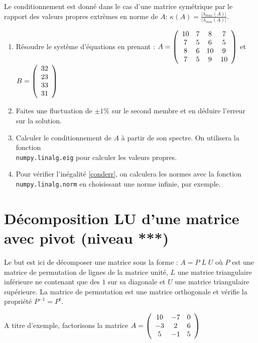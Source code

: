 \documentclass[a4paper, 10pt]{article}
\begin{document}
Le conditionnement est donné dans le cas d'une matrice symétrique
 par le rapport des valeurs propres  extrèmes en norme de $A$:
 $\kappa(A) = \frac{|\lambda_{max}(A)|}{|\lambda_{min}(A)|}$.
 
  \begin{enumerate} 
 \item Résoudre le système d'équations en prenant :
 $A=\left(
\begin{array}{c c c c}
10  & 7   &   8 & 7  \\
7  &  5   & 6 & 5   \\
8  &  6  &  10   & 9  \\
7 & 5  & 9  &  10  
\end{array}
\right)$
et $B=\left(
\begin{array}{c c c c}
32  \\
23   \\
33  \\
31 
\end{array}
\right)$ 
 \item Faites une fluctuation de $\pm 1\%$ sur le second membre et en déduire l'erreur
 sur la solution. 
 \item Calculer le conditionnement de $A$ à partir de son spectre. On utilisera la
 fonction \\ {\tt numpy.linalg.eig} pour calculer les valeurs propres.
 \item Pour vérifier l'inégalité \eqref{conderr},  on calculera les normes avec la fonction
 {\tt  numpy.linalg.norm} en choisissant une norme infinie, par exemple.
 \end{enumerate}
 
\section{Décomposition LU d'une matrice avec pivot (niveau ***)}

Le but est ici de décomposer une matrice sous la forme : $A=P\; L\; U$
où $P$ est une matrice de permutation de lignes de la matrice unité,
$L$ une matrice triangulaire inférieure ne contenant que des $1$ sur sa diagonale et 
$U$ une matrice triangulaire supérieure.
La matrice de permutation est une matrice orthogonale et vérifie la propriété
$P^{-1}=P^t$.

A titre d'exemple, factorisons la matrice
 $A=\left(
\begin{array}{c c c}
10  & -7   &  0  \\
-3  &  2   & 6   \\
 5  &  -1  &  5  
\end{array}
\right)$
\end{document}
